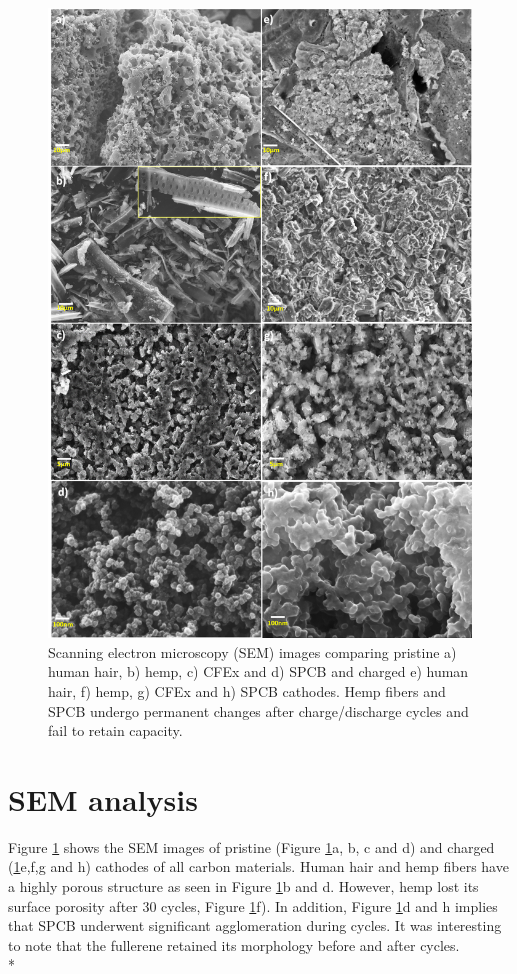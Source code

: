 \newpage
\begin{figure}[h!]
  \centering
  \includegraphics[width=\textwidth]{Figures/chap5fig/SEM}
    \caption{Scanning electron microscopy (SEM) images comparing pristine a) human hair, b) hemp, c) CFEx and d) SPCB and charged e) human hair, f) hemp, g) CFEx and h) SPCB cathodes. Hemp fibers and SPCB undergo permanent changes after charge/discharge cycles and fail to retain capacity.}
  \label{Figures/chap5fig:SEM}
\end{figure}

\section*{SEM analysis}
Figure \ref{Figures/chap5fig:SEM} shows the SEM images of pristine (Figure \ref{Figures/chap5fig:SEM}a, b, c and d) and charged (\ref{Figures/chap5fig:SEM}e,f,g and h) cathodes of all carbon materials. Human hair and hemp fibers have a highly porous structure as seen in Figure \ref{Figures/chap5fig:SEM}b and d. However, hemp lost its surface porosity after 30 cycles, Figure \ref{Figures/chap5fig:SEM}f). In addition, Figure \ref{Figures/chap5fig:SEM}d and h implies that SPCB underwent significant agglomeration during cycles. It was interesting to note that the fullerene retained its morphology before and after cycles.\\*

